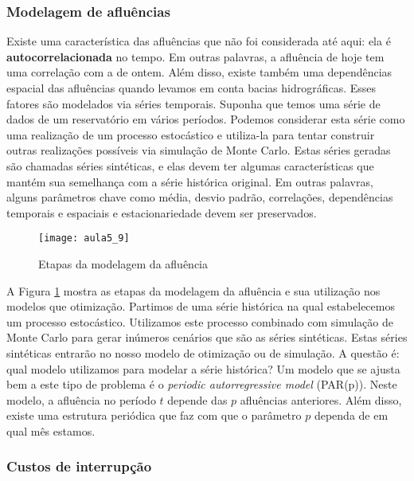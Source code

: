 \subsubsection{Modelagem de afluências}

Existe uma característica das afluências que não foi considerada até aqui: ela é \textbf{autocorrelacionada} no tempo. Em outras palavras, a afluência de hoje tem uma correlação com a de ontem. Além disso, existe também uma dependências espacial das afluências quando levamos em conta bacias hidrográficas. Esses fatores são modelados via séries temporais. Suponha que temos uma série de dados de um reservatório em vários períodos. Podemos considerar esta série como uma realização de um processo estocástico e utiliza-la para tentar construir outras realizações possíveis via simulação de Monte Carlo. Estas séries geradas são chamadas séries sintéticas, e elas devem ter algumas características que mantém sua semelhança com a série histórica original. Em outras palavras, alguns parâmetros chave como média, desvio padrão, correlações, dependências temporais e espaciais e estacionariedade devem ser preservados. 


\begin{figure}[H]
\begin{centering}
\texttt{[image: aula5\_9]}\protect\caption{\label{fig:aflu1} Etapas da modelagem da afluência} 
\end{centering}
\end{figure}

A Figura \ref{fig:aflu1} mostra as etapas da modelagem da afluência e sua utilização nos modelos que otimização. Partimos de uma série histórica na qual estabelecemos um processo estocástico. Utilizamos este processo combinado com simulação de Monte Carlo para gerar inúmeros cenários que são as séries sintéticas. Estas séries sintéticas entrarão no nosso modelo de otimização ou de simulação. A questão é: qual modelo utilizamos para modelar a série histórica? Um modelo que se ajusta bem a este tipo de problema é o \textit{periodic autorregressive model} (PAR(p)). Neste modelo, a afluência no período $t$ depende das $p$ afluências anteriores. Além disso, existe uma estrutura periódica que faz com que o parâmetro $p$ dependa de em qual mês estamos.


\subsubsection{Custos de interrupção}

